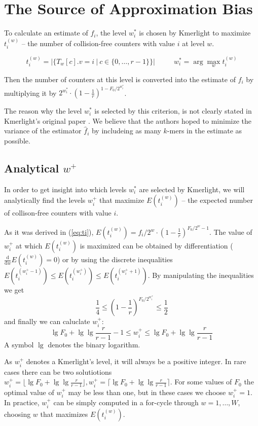 \section{The Source of Approximation Bias}
\label{sec:source-of-bias}

To calculate an estimate of $f_i$, the level $w_i^*$ is chosen by Kmerlight
to maximize $t_i^{(w)}$ -- the number of collision-free counters with value $i$ at level $w$.

$$t_i^{(w)} = |\{T_w[c].v = i ~|~ c \in \{0, \dots, r-1\}\}| 
~~~~~~~~~~~~ w_i^* = \arg\max_w t_i^{(w)}$$

Then the number of counters at this level is converted into the estimate of
$f_i$ by multiplying it by $2^{w^*_i} \cdot \left(1 - \frac{1}{r}\right)^{1 - F_0/2^{w^*_i}}$. 

The reason why the level $w_i^*$ is selected by this criterion, 
is not clearly stated in Kmerlight's original paper \cite{Sivadasan2016}. 
We believe that the authors hoped to minimize the variance of the estimator $\hat f_i$
by includeing as many $k$-mers in the estimate as possible.

\subsection{Analytical $w^+$}
\label{sec:analytical-w}
In order to get insight into which levels $w_i^*$ are selected by Kmerlight, 
we will analytically find the levels $w_i^+$ that maximize $E(t_i^{(w)})$ -- the expected number 
of collison-free counters with value $i$.

As it was derived in (\ref{eq:ti}), 
$E(t_i^{(w)}) = f_i / 2^w \cdot \left(1 - \frac{1}{r}\right)^{F_0/2^w - 1}$.
The value of $w_i^+$ at which $E(t_i^{(w)})$ is maximized can be obtained by differentiation 
($\frac{\mathrm{d}}{\mathrm{d}w}E(t_i^{(w)}) = 0$) or by using the discrete inequalities 
$E(t_i^{(w^+_i-1)}) \leq E(t_i^{(w^+_i)}) \leq E(t_i^{(w^+_i+1)})$. 
By manipulating the inequalities we get
\begin{equation} \label{eq:wplusbounds}
\frac{1}{4} \leq \left(1 - \frac{1}{r}\right)^{F_0/2^{w^+_i}} \leq \frac{1}{2}
\end{equation}
and finally we can caluclate $w_i^+$:
$$\lg F_0 + \lg\lg \frac{r}{r-1}-1 \leq w_i^+ \leq \lg F_0 + \lg\lg \frac{r}{r-1}$$
A symbol $\lg$ denotes the binary logarithm. 

As $w_i^+$ denotes a Kmerlight's level, it will always be a positive integer.
In rare cases there can be two solutiotions $w_i^+ = \lfloor \lg F_0 + \lg\lg \frac{r}{r-1} \rfloor,
w_i^+ = \lceil \lg F_0 + \lg\lg \frac{r}{r-1} \rceil$. For some values of $F_0$ the optimal 
value of $w_i^+$ may be less than one, but in these cases we choose $w_i^+=1$. In practice,
$w^+_i$ can be simply computed in a for-cycle through $w=1, \dots, W$, choosing $w$ that
maximizes $E(t_i^{(w)})$. 

